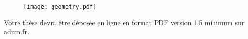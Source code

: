 \begin{figure}[h!tbp]
	\centering
	\texttt{[image: geometry.pdf]}
\end{figure}


Votre thèse devra être déposée en ligne en format PDF version 1.5 minimum sur \href{https://www.adum.fr/}{adum.fr}.


